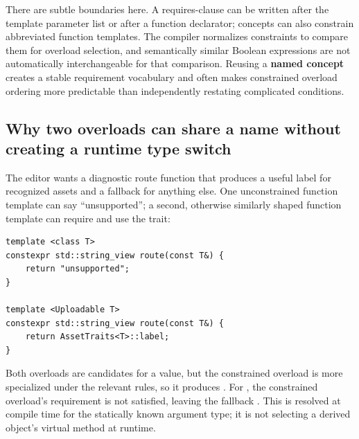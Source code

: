 There are subtle boundaries here. A requires-clause can be written after the template parameter list or after a function declarator; concepts can also constrain abbreviated function templates. The compiler normalizes constraints to compare them for overload selection, and semantically similar Boolean expressions are not automatically interchangeable for that comparison. Reusing a \textbf{named concept} creates a stable requirement vocabulary and often makes constrained overload ordering more predictable than independently restating complicated conditions.

\subsection{Why two overloads can share a name without creating a runtime type switch}\label{05-engine-i-ch005-why-two-overloads-can-share-a-name-without-creating-a-runtime-type-switch}

\hypertarget{05-engine-i-ch005-why-two-overloads-can-share-a-name-without-creating-a-runtime-type-switch}{}

The editor wants a diagnostic route function that produces a useful label for recognized assets and a fallback for anything else. One unconstrained function template can say ``unsupported''; a second, otherwise similarly shaped function template can require  and use the trait:

\begin{verbatim}
template <class T>
constexpr std::string_view route(const T&) {
    return "unsupported";
}

template <Uploadable T>
constexpr std::string_view route(const T&) {
    return AssetTraits<T>::label;
}
\end{verbatim}

Both overloads are candidates for a  value, but the constrained overload is more specialized under the relevant rules, so it produces . For , the constrained overload's requirement is not satisfied, leaving the fallback . This is resolved at compile time for the statically known argument type; it is not selecting a derived object's virtual method at runtime.

